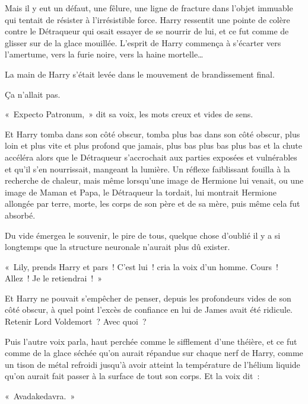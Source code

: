 Mais il y eut un défaut, une fêlure, une ligne de fracture dans l'objet immuable qui tentait de résister à l'irrésistible force.
Harry ressentit une pointe de colère contre le Détraqueur qui osait essayer de se nourrir de lui, et ce fut comme de glisser sur de la glace mouillée.
L'esprit de Harry commença à s'écarter vers l'amertume, vers la furie noire, vers la haine mortelle…

La main de Harry s'était levée dans le mouvement de brandissement final.

Ça n'allait pas.

«~Expecto Patronum,~» dit sa voix, les mots creux et vides de sens.

Et Harry tomba dans son côté obscur, tomba plus bas dans son côté obscur, plus loin et plus vite et plus profond que jamais, plus bas plus bas plus bas et la chute accéléra alors que le Détraqueur s'accrochait aux parties exposées et vulnérables et qu'il s'en nourrissait, mangeant la lumière.
Un réflexe faiblissant fouilla à la recherche de chaleur, mais même lorsqu'une image de Hermione lui venait, ou une image de Maman et Papa, le Détraqueur la tordait, lui montrait Hermione allongée par terre, morte, les corps de son père et de sa mère, puis même cela fut absorbé.

Du vide émergea le souvenir, le pire de tous, quelque chose d'oublié il y a si longtemps que la structure neuronale n'aurait plus dû exister.
\begin{em}
«~Lily, prends Harry et pars~!
C'est lui~! cria la voix d'un homme.
Cours~! Allez~!
Je le retiendrai~!~»

Et Harry ne pouvait s'empêcher de penser, depuis les profondeurs vides de son côté obscur, à quel point l'excès de confiance en lui de James avait été ridicule.
Retenir Lord Voldemort~?
Avec quoi~?

Puis l'autre voix parla, haut perchée comme le sifflement d'une théière, et ce fut comme de la glace séchée qu'on aurait répandue sur chaque nerf de Harry, comme un tison de métal refroidi jusqu'à avoir atteint la température de l'hélium liquide qu'on aurait fait passer à la surface de tout son corps.
Et la voix dit~:

«~Avadakedavra.~»
\end{em}

